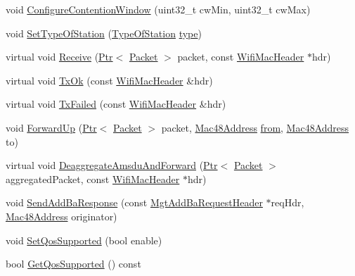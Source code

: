 \begin{DoxyCompactItemize}
\item 
void \hyperlink{classns3_1_1RegularWifiMac_aa6da62735de3b3aaa10f713a8832c3c6}{Configure\+Contention\+Window} (uint32\+\_\+t cw\+Min, uint32\+\_\+t cw\+Max)
\item 
void \hyperlink{classns3_1_1RegularWifiMac_ab388733458378c0cbf456d0368eee723}{Set\+Type\+Of\+Station} (\hyperlink{namespacens3_a21fd18ff410cecc971a0c27634830445}{Type\+Of\+Station} \hyperlink{visualizer-ideas_8txt_add98db9e15e2a58cf2b57623e7aa893a}{type})
\item 
virtual void \hyperlink{classns3_1_1RegularWifiMac_a9abbbcea65b6dc416ab1b44785c40e9f}{Receive} (\hyperlink{classns3_1_1Ptr}{Ptr}$<$ \hyperlink{classns3_1_1Packet}{Packet} $>$ packet, const \hyperlink{classns3_1_1WifiMacHeader}{Wifi\+Mac\+Header} $\ast$hdr)
\item 
virtual void \hyperlink{classns3_1_1RegularWifiMac_a3ba5567e68201374ee1509d2cb1bbe7f}{Tx\+Ok} (const \hyperlink{classns3_1_1WifiMacHeader}{Wifi\+Mac\+Header} \&hdr)
\item 
virtual void \hyperlink{classns3_1_1RegularWifiMac_a5ceb49e604b64dd12289968581693e41}{Tx\+Failed} (const \hyperlink{classns3_1_1WifiMacHeader}{Wifi\+Mac\+Header} \&hdr)
\item 
void \hyperlink{classns3_1_1RegularWifiMac_a34df292af97e69fefda8303cdb323d1d}{Forward\+Up} (\hyperlink{classns3_1_1Ptr}{Ptr}$<$ \hyperlink{classns3_1_1Packet}{Packet} $>$ packet, \hyperlink{classns3_1_1Mac48Address}{Mac48\+Address} \hyperlink{lte__amc_8m_a1b4c81ff74eb1a626b5ade44c81004b3}{from}, \hyperlink{classns3_1_1Mac48Address}{Mac48\+Address} to)
\item 
virtual void \hyperlink{classns3_1_1RegularWifiMac_a21621ca70e5d272de72d0609eb43cf15}{Deaggregate\+Amsdu\+And\+Forward} (\hyperlink{classns3_1_1Ptr}{Ptr}$<$ \hyperlink{classns3_1_1Packet}{Packet} $>$ aggregated\+Packet, const \hyperlink{classns3_1_1WifiMacHeader}{Wifi\+Mac\+Header} $\ast$hdr)
\item 
void \hyperlink{classns3_1_1RegularWifiMac_a7f68e740fc48cfc03df7330077af8113}{Send\+Add\+Ba\+Response} (const \hyperlink{classns3_1_1MgtAddBaRequestHeader}{Mgt\+Add\+Ba\+Request\+Header} $\ast$req\+Hdr, \hyperlink{classns3_1_1Mac48Address}{Mac48\+Address} originator)
\item 
void \hyperlink{classns3_1_1RegularWifiMac_a0692f6e43a82d60aecaa674bc82e926f}{Set\+Qos\+Supported} (bool enable)
\item 
bool \hyperlink{classns3_1_1RegularWifiMac_a590246c305c704d62ce683b9e354a16d}{Get\+Qos\+Supported} () const 

\end{DoxyCompactItemize}
